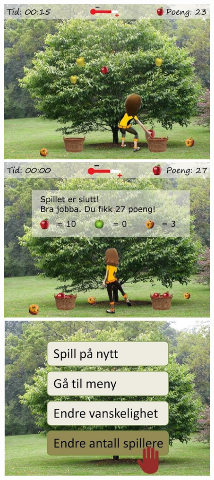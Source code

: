 \begin{figure} [H]
\centering
\includegraphics[scale=0.45]{menuStep3.jpg}
\label{app:menu2Norsk}
\end{figure}


